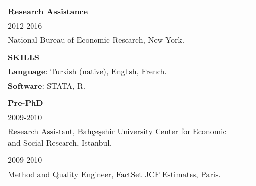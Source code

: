 \documentclass[12 pt]{article}
\begin{document}
\begin{longtable}{ccccc}
\\
\multicolumn{4}{l}{\textbf{Research Assistance}} \\ 
\multicolumn{4}{l}{2012-2016} \\ 
\multicolumn{4}{l}{National Bureau of Economic Research, New York.}  \\
\\



\multicolumn{5}{l}{\textbf{SKILLS}}\\[2 pt]

 \multicolumn{4}{l}{\textbf{Language}: Turkish (native), English, French.}      \\
  \multicolumn{4}{l}{\textbf{Software}: STATA, R.}\\
 \\


\multicolumn{4}{l}{\textbf{Pre-PhD}} \\[2 pt] 
\multicolumn{4}{l}{2009-2010} \\ 
\multicolumn{4}{l}{Research Assistant, Bah\c{c}e\c{s}ehir University Center for Economic and Social Research, Istanbul.}    \\

\\
\multicolumn{4}{l}{2009-2010} \\ 
\multicolumn{4}{l}{Method and Quality Engineer, FactSet JCF Estimates, Paris.}  \\




\end{longtable}

 
\end{document}
